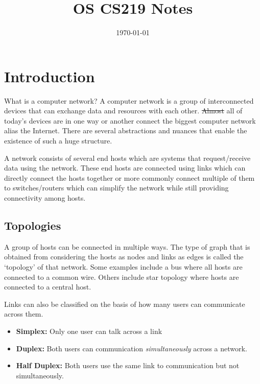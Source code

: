 \documentclass[12pt]{article}
\title{OS CS219 Notes}
\author{}
\date{\today}
\newcommand{\tbox}[1]{\noindent\fbox{\parbox{\textwidth}{#1}}}
\begin{document}
\maketitle
\setlength{\parskip}{6pt}
\setlength{\parindent}{0pt}


\noindent\tbox{
    \begin{center}
    \textbf{\Huge Lecture 1}
    \end{center}
}

\section{Introduction}
What is a computer network? A computer network is a group of interconnected devices that can exchange data and resources with each other.
\st{Almost} all of today's devices are in one way or another connect the biggest computer network alias the Internet. There are several 
abstractions and nuances that enable the existence of such a huge structure.

A network consists of several end hosts which are systems that request/receive data using the network. These end hosts are connected 
using links which can directly connect the hosts together or more commonly connect multiple of them to switches/routers which can 
simplify the network while still providing connectivity among hosts. 

\subsection{Topologies}

A group of hosts can be connected in multiple ways. The type of graph that is obtained from considering the 
hosts as nodes and links as edges is called the `topology' of that network. 
Some examples include a bus where all hosts are connected to a common wire. Others include star topology where hosts are connected to a central host. 

Links can also be classified on the basis of how many users can communicate across them.
\begin{itemize}
    \item \textbf{Simplex:} Only one user can talk across a link
    \item \textbf{Duplex:} Both users can communication \textit{simultaneously} across a network. 
    \item \textbf{Half Duplex:} Both users use the same link to communication but not simultaneously. 
\end{itemize}
\end{document}
